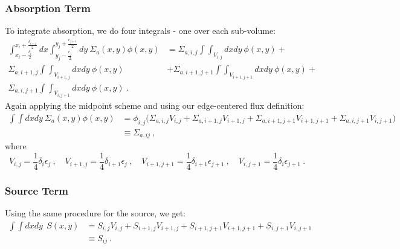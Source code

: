 \documentclass[12pt]{article}
\begin{document}
\subsubsection*{Absorption Term}
To integrate absorption, we do four integrals - one over each sub-volume:
%
\begin{align}
\int_{x_i-\frac{\delta_{i}}{2}}^{x_i+\frac{\delta_{i+1}}{2}} dx \int_{y_j-\frac{\epsilon_{j}}{2}}^{y_j+\frac{\epsilon_{j+1}}{2}}dy\:\Sigma_a(x,y) \phi(x,y) &= \Sigma_{a,i,j}\int\int_{V_{i,j}} dx dy \: \phi(x,y) + \nonumber \\
%
\Sigma_{a,i+1,j}\int\int_{V_{i+1,j}} dx dy \: \phi(x,y) &+ \Sigma_{a,i+1,j+1}\int\int_{V_{i+1,j+1}} dx dy \: \phi(x,y) + \nonumber \\
 \Sigma_{a,i,j+1}\int\int_{V_{i,j+1}} dx dy \: \phi(x,y) \:.\nonumber
\end{align}
%
Again applying the midpoint scheme and using our edge-centered flux definition:
%
\begin{align}
\int \int dx dy\:\Sigma_a(x,y) \phi(x,y) &= \boxed{\phi_{i,j}\bigl(\Sigma_{a,i,j} V_{i,j} + \Sigma_{a,i+1,j} V_{i+1,j} + \Sigma_{a,i+1,j+1} V_{i+1,j+1} + \Sigma_{a,i,j+1} V_{i,j+1} \bigr) } \nonumber \\
&\equiv \Sigma_{a,ij}\:, \nonumber
\end{align}
%
where
\[V_{i,j} = \frac{1}{4}\delta_i \epsilon_j \:, \quad V_{i+1,j} = \frac{1}{4}\delta_{i+1} \epsilon_{j} \:, \quad V_{i+1,j+1} = \frac{1}{4}\delta_{i+1} \epsilon_{j+1} \:, \quad V_{i,j+1} = \frac{1}{4}\delta_{i} \epsilon_{j+1} \:.\]


\subsubsection*{Source Term}
Using the same procedure for the source, we get:
\begin{align}
\int \int dx dy \: \:S(x,y) &= \boxed{ S_{i,j} V_{i,j} + S_{i+1,j} V_{i+1,j} + S_{i+1,j+1} V_{i+1,j+1} + S_{i,j+1} V_{i,j+1} }\nonumber \\
&\equiv S_{ij}\:. \nonumber
\end{align}


\end{document}
